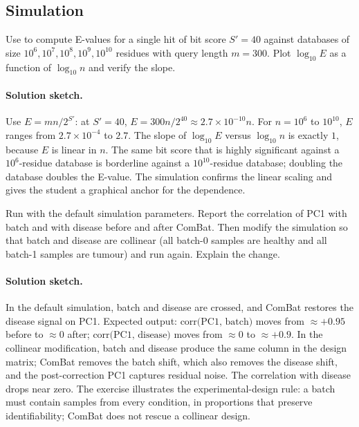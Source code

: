 \subsection*{Simulation}

\begin{exercise}
Use
to compute E-values for a single hit of bit score $S' = 40$ against
databases of size $10^{6}, 10^{7}, 10^{8}, 10^{9}, 10^{10}$ residues
with query length $m = 300$. Plot $\log_{10} E$ as a function of
$\log_{10} n$ and verify the slope.

\paragraph{Solution sketch.}
Use $E = m n / 2^{S'}$: at $S' = 40$, $E = 300 n / 2^{40} \approx
2.7 \times 10^{-10} n$. For $n = 10^{6}$ to $10^{10}$, $E$ ranges from
$2.7 \times 10^{-4}$ to $2.7$. The slope of $\log_{10} E$ versus
$\log_{10} n$ is exactly $1$, because $E$ is linear in $n$. The same
bit score that is highly significant against a $10^{6}$-residue
database is borderline against a $10^{10}$-residue database; doubling
the database doubles the E-value. The simulation confirms the linear
scaling and gives the student a graphical anchor for the dependence.
\end{exercise}

\begin{exercise}
Run
with the default simulation parameters. Report the correlation of PC1
with batch and with disease before and after ComBat. Then modify the
simulation so that batch and disease are collinear (all batch-0 samples
are healthy and all batch-1 samples are tumour) and run again. Explain
the change.

\paragraph{Solution sketch.}
In the default simulation, batch and disease are crossed, and ComBat
restores the disease signal on PC1. Expected output: $\text{corr(PC1,
batch)}$ moves from $\approx +0.95$ before to $\approx 0$ after;
$\text{corr(PC1, disease)}$ moves from $\approx 0$ to $\approx +0.9$.
In the collinear modification, batch and disease produce the same
column in the design matrix; ComBat removes the batch shift, which
also removes the disease shift, and the post-correction PC1 captures
residual noise. The correlation with disease drops near zero. The
exercise illustrates the experimental-design rule: a batch must
contain samples from every condition, in proportions that preserve
identifiability; ComBat does not rescue a collinear design.
\end{exercise}

